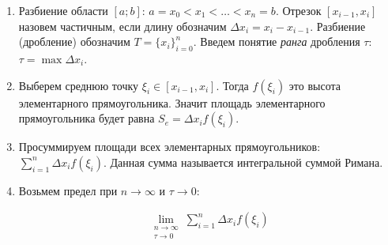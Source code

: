 \begin{multicols}{2}

\begin{enumerate}
  \item Разбиение области \([a;b]\): \(a = x_{0} < x_{1} < \dotsc < x_{n} = b\).
  Отрезок \([x_{i - 1}, x_{i}]\) назовем частичным, если длину обозначим 
  \(\Delta x_{i} = x_{i} - x_{i - 1}\).
  Разбиение (дробление) обозначим \(T = \{ x_{i} \}_{i = 0}^{n}\). Введем
  понятие \textit{ранга} дробления \(\tau\): \(\tau = \max \Delta x_{i}\).

  \item Выберем среднюю точку \(\xi_{i} \in [x_{i - 1}, x_{i}]\). Тогда
  \(f(\xi_{i})\) это высота элементарного прямоугольника. Значит площадь
  элементарного прямоугольника будет равна \(S_{e} = \Delta x_{i} f(\xi_{i})\).

  \item Просуммируем площади всех элементарных прямоугольников:
  \(\sum_{i = 1}^{n} \Delta x_{i} f(\xi_{i})\). Данная сумма называется
  интегральной суммой Римана.

  \item Возьмем предел при \(n \to \infty\) и \(\tau \to 0\):
  
  \begin{align*}\label{eq:lim-int-sum}\tag{1}
    \lim_{\substack{n \to \infty \\ \tau \to 0}}
      \sum_{i = 1}^{n} \Delta x_{i} f(\xi_{i})
  \end{align*}
\end{enumerate}
\end{multicols}

